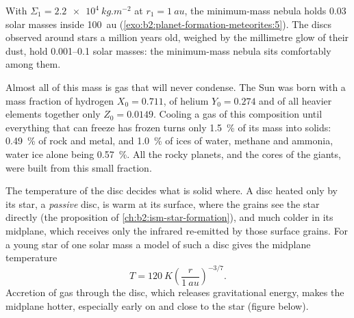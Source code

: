 With $\Sigma_1 = \qty{2.2e4}{kg.m^{-2}}$ at $r_1 = \qty{1}{au}$, the minimum-mass
nebula holds $0.03$ solar masses inside \qty{100}{au} (\cref{exo:b2:planet-formation-meteorites:5}). The discs
observed around stars a million years old, weighed by the millimetre glow of
their dust, hold \numrange{0.001}{0.1} solar masses: the minimum-mass nebula
sits comfortably among them.

Almost all of this mass is gas that will never condense. The Sun was born
with a mass fraction of hydrogen $X_0 = 0.711$, of helium $Y_0 = 0.274$ and of
all heavier elements together only $Z_0 = 0.0149$. Cooling a gas of this
composition until everything that can freeze has frozen turns only
\qty{1.5}{\percent} of its mass into solids: \qty{0.49}{\percent} of rock and
metal, and \qty{1.0}{\percent} of ices of water, methane and ammonia, water ice
alone being \qty{0.57}{\percent}. All the rocky planets, and the cores of the
giants, were built from this small fraction.

The temperature of the disc decides what is solid where. A disc heated only by
its star, a \emph{passive} disc, is warm at its surface, where the grains see
the star directly (the proposition of \cref{ch:b2:ism-star-formation}), and
much colder in its midplane, which receives only the infrared re-emitted by
those surface grains. For a young star of one solar mass a model of such a disc
gives the midplane temperature
\[
  T = \qty{120}{K}\left(\frac{r}{\qty{1}{au}}\right)^{-3/7}.
\]
Accretion of gas through the disc, which releases gravitational energy, makes
the midplane hotter, especially early on and close to the star (figure below).

